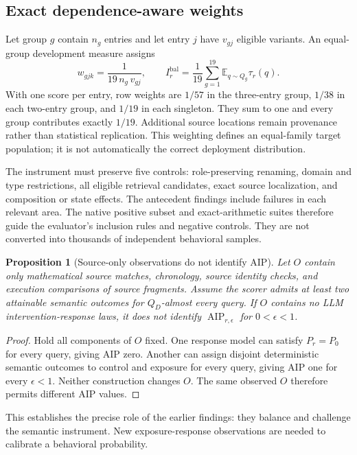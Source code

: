 \documentclass[11pt,letterpaper]{article}
\newtheorem{proposition}[theorem]{Proposition}
\theoremstyle{definition}\newtheorem{definition}[theorem]{Definition}
\newcommand{\AIP}{\operatorname{AIP}}
\newcommand{\E}{\mathbb{E}}
\begin{document}
\subsection{Exact dependence-aware weights}
Let group $g$ contain $n_g$ entries and let entry $j$ have $v_{gj}$ eligible variants. An equal-group development measure assigns
\begin{equation}
w_{gjk}=\frac{1}{19\,n_g\,v_{gj}},
\qquad
I_r^{\mathrm{bal}}
=\frac1{19}\sum_{g=1}^{19}\E_{q\sim Q_g}\tau_r(q).
\label{eq:balance}
\end{equation}
With one score per entry, row weights are $1/57$ in the three-entry group, $1/38$ in each two-entry group, and $1/19$ in each singleton. They sum to one and every group contributes exactly $1/19$. Additional source locations remain provenance rather than statistical replication. This weighting defines an equal-family target population; it is not automatically the correct deployment distribution.

The instrument must preserve five controls: role-preserving renaming, domain and type restrictions, all eligible retrieval candidates, exact source localization, and composition or state effects. The antecedent findings include failures in each relevant area. The native positive subset and exact-arithmetic suites therefore guide the evaluator's inclusion rules and negative controls. They are not converted into thousands of independent behavioral samples.

\begin{proposition}[Source-only observations do not identify AIP]
Let $O$ contain only mathematical source matches, chronology, source identity checks, and execution comparisons of source fragments. Assume the scorer admits at least two attainable semantic outcomes for $Q_D$-almost every query. If $O$ contains no LLM intervention-response laws, it does not identify $\AIP_{r,\epsilon}$ for $0<\epsilon<1$.
\end{proposition}
\begin{proof}
Hold all components of $O$ fixed. One response model can satisfy $P_r=P_0$ for every query, giving AIP zero. Another can assign disjoint deterministic semantic outcomes to control and exposure for every query, giving AIP one for every $\epsilon<1$. Neither construction changes $O$. The same observed $O$ therefore permits different AIP values.
\end{proof}
This establishes the precise role of the earlier findings: they balance and challenge the semantic instrument. New exposure-response observations are needed to calibrate a behavioral probability.
\end{document}
